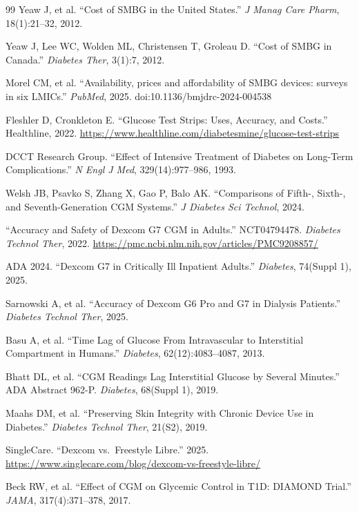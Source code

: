 \begin{thebibliography}{99}
Yeaw J, et al.
``Cost of SMBG in the United States.''
\textit{J Manag Care Pharm}, 18(1):21--32, 2012.

Yeaw J, Lee WC, Wolden ML, Christensen T, Groleau D.
``Cost of SMBG in Canada.''
\textit{Diabetes Ther}, 3(1):7, 2012.

Morel CM, et al.
``Availability, prices and affordability of SMBG devices: surveys in six LMICs.''
\textit{PubMed}, 2025. doi:10.1136/bmjdrc-2024-004538

Fleshler D, Cronkleton E. ``Glucose Test Strips: Uses, Accuracy, and Costs.''
Healthline, 2022. \url{https://www.healthline.com/diabetesmine/glucose-test-strips}

DCCT Research Group.
``Effect of Intensive Treatment of Diabetes on Long-Term Complications.''
\textit{N Engl J Med}, 329(14):977--986, 1993.

Welsh JB, Psavko S, Zhang X, Gao P, Balo AK.
``Comparisons of Fifth-, Sixth-, and Seventh-Generation CGM Systems.''
\textit{J Diabetes Sci Technol}, 2024.

``Accuracy and Safety of Dexcom G7 CGM in Adults.'' NCT04794478.
\textit{Diabetes Technol Ther}, 2022.
\url{https://pmc.ncbi.nlm.nih.gov/articles/PMC9208857/}

ADA 2024. ``Dexcom G7 in Critically Ill Inpatient Adults.''
\textit{Diabetes}, 74(Suppl 1), 2025.

Sarnowski A, et al.
``Accuracy of Dexcom G6 Pro and G7 in Dialysis Patients.''
\textit{Diabetes Technol Ther}, 2025.

Basu A, et al.
``Time Lag of Glucose From Intravascular to Interstitial Compartment in Humans.''
\textit{Diabetes}, 62(12):4083--4087, 2013.

Bhatt DL, et al.
``CGM Readings Lag Interstitial Glucose by Several Minutes.''
ADA Abstract 962-P. \textit{Diabetes}, 68(Suppl 1), 2019.

Maahs DM, et al.
``Preserving Skin Integrity with Chronic Device Use in Diabetes.''
\textit{Diabetes Technol Ther}, 21(S2), 2019.

SingleCare. ``Dexcom vs.\ Freestyle Libre.'' 2025.
\url{https://www.singlecare.com/blog/dexcom-vs-freestyle-libre/}

Beck RW, et al.
``Effect of CGM on Glycemic Control in T1D: DIAMOND Trial.''
\textit{JAMA}, 317(4):371--378, 2017.


\end{thebibliography}
